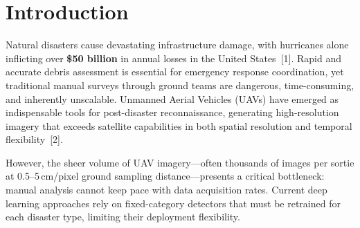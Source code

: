 \documentclass[10pt,a4paper,twocolumn]{article}
\begin{document}

\section{Introduction}

Natural disasters cause devastating infrastructure damage, with hurricanes alone inflicting over \textbf{\$50 billion} in annual losses in the United States~[1]. Rapid and accurate debris assessment is essential for emergency response coordination, yet traditional manual surveys through ground teams are dangerous, time-consuming, and inherently unscalable. Unmanned Aerial Vehicles (UAVs) have emerged as indispensable tools for post-disaster reconnaissance, generating high-resolution imagery that exceeds satellite capabilities in both spatial resolution and temporal flexibility~[2].

However, the sheer volume of UAV imagery---often thousands of images per sortie at 0.5--5\,cm/pixel ground sampling distance---presents a critical bottleneck: manual analysis cannot keep pace with data acquisition rates. Current deep learning approaches rely on fixed-category detectors that must be retrained for each disaster type, limiting their deployment flexibility.
\end{document}
